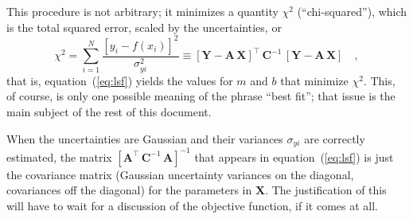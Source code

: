 \documentclass[12pt,twoside]{article}
\newcommand{\documentname}{document}
\newcommand{\equationname}{equation}
\newcommand{\mmatrix}[1]{\boldsymbol{#1}}
\newcommand{\inverse}[1]{{#1}^{-1}}
\newcommand{\transpose}[1]{{#1}^{\scriptscriptstyle \top}}
\newcommand{\mA}{\mmatrix{A}}
\newcommand{\mAT}{\transpose{\mA}}
\newcommand{\mC}{\mmatrix{C}}
\newcommand{\mCinv}{\inverse{\mC}}
\newcommand{\mX}{\mmatrix{X}}
\newcommand{\mY}{\mmatrix{Y}}
\begin{document}
This procedure is not arbitrary; it minimizes a quantity $\chi^2$
(``chi-squared''), which is the total squared error, scaled by the
uncertainties, or
\begin{equation}\label{eq:chisquared}
\chi^2
 = \sum_{i=1}^N \frac{\left[y_i - f(x_i)\right]^2}{\sigma_{yi}^2}
 \equiv \transpose{\left[\mY-\mA\,\mX\right]}
 \,\mCinv\,\left[\mY-\mA\,\mX\right]
 \quad ,
\end{equation}
that is, \equationname~(\ref{eq:lsf}) yields the values for $m$ and
$b$ that minimize $\chi^2$.  This, of course, is only one possible
meaning of the phrase ``best fit''; that issue is the main subject of
the rest of this \documentname.

When the uncertainties are Gaussian and their variances $\sigma_{yi}$
are correctly estimated, the matrix
$\inverse{\left[\mAT\,\mCinv\,\mA\right]}$ that appears in
\equationname~(\ref{eq:lsf}) is just the covariance matrix (Gaussian
uncertainty variances on the diagonal, covariances off the diagonal)
for the parameters in $\mX$.  The justification of this will have to
wait for a discussion of the objective function, if it comes at all.
\end{document}
